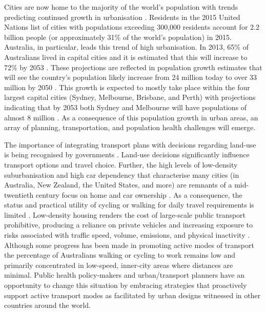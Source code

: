 \documentclass[sageh,times]{sagej}
\begin{document}
Cities are now home to the majority of the world's population with trends predicting continued growth in urbanisation \citep{UNDESA2015,WHO2016}. Residents in the 2015 United Nations list of cities with populations exceeding 300,000 residents \citep{UN2014} account for 2.2 billion people (or approximately 31\% of the world's population) in 2015. Australia, in particular, leads this trend of high urbanisation. In 2013, 65\% of Australians lived in capital cities and it is estimated that this will increase to 72\% by 2053  \citep{ABS2008}. These projections are reflected in population growth estimates that will see the country's population likely increase from 24 million today to over 33 million by 2050  \citep{ABS2008}. This growth is expected to mostly take place within the four largest capital cities (Sydney, Melbourne, Brisbane, and Perth) with projections indicating that by 2053 both Sydney and Melbourne will have populations of almost 8 million  \citep{CommonwealthofAustralia2010}. As a consequence of this population growth in urban areas, an array of planning, transportation, and population health challenges will emerge.

The importance of integrating transport plans with decisions regarding land-use is being recognised by governments \citep{ATAP2016,SAustralia2015}. Land-use decisions significantly influence transport options and travel choice. Further, the high levels of low-density suburbanisation and high car dependency that characterise many cities (in Australia, New Zealand, the United States, and more) are remnants of a mid-twentieth century focus on home and car ownership \citep{Currie2007,Dodson2008}. As a consequence, the status and practical utility of cycling or walking for daily travel requirements is limited \citep{Heesch2014,Daley2011}. Low-density housing renders the cost of large-scale public transport prohibitive, producing a reliance on private vehicles and increasing exposure to risks associated with traffic speed, volume, emissions, and physical inactivity  \citep{Cepeda2016,MingWen2008,Norman2006}. Although some progress has been made in promoting active modes of transport the percentage of Australians walking or cycling to work remains low and primarily concentrated in low-speed, inner-city areas where distances are minimal. Public health policy-makers and urban/transport planners have an opportunity to change this situation by embracing strategies that proactively support active transport modes as facilitated by urban designs witnessed in other countries around the world.
\end{document}
